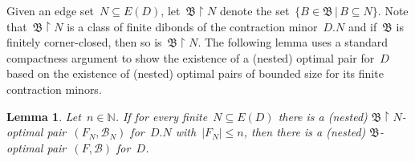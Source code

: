 \documentclass[reqno, 12pt]{amsart}
\numberwithin{equation}{section}
\numberwithin{figure}{section}
\theoremstyle{plain}
\newtheorem{lemma}[thm]{Lemma}
\theoremstyle{definition}
\newcommand{\restricted}{\ensuremath{{\upharpoonright}}}
\newcommand{\abs}[1]{\ensuremath{{\lvert {#1} \rvert}}}
\begin{document}
\vspace{0.2cm}

Given an edge set~${N \subseteq E(D)}$, let~${\mathfrak{B}\restricted{N}}$ denote the set~${\{ B \in \mathfrak{B} \, | \, B \subseteq N \}}$. 
Note that~$\mathfrak{B}\restricted{N}$ is a class of finite dibonds of the contraction minor~${D.N}$ and if~$\mathfrak{B}$ is finitely corner-closed, then so is~$\mathfrak{B}\restricted{N}$. 
The following lemma uses a standard compactness argument to show the existence of a (nested) optimal pair for~$D$ based on the existence of (nested) optimal pairs of bounded size for its finite contraction minors.

\begin{lemma}
    \label{lem:fin-parameter-compactness}
    Let~${n \in \mathbb{N}}$. 
    If for every finite~${N \subseteq E(D)}$ there is a (nested) ${\mathfrak{B}\restricted{N}}$-optimal pair~${(F_N, \mathcal{B}_N)}$ for~${D.N}$ with~${\abs{F_N} \leq n}$, then there is a (nested) $\mathfrak{B}$-optimal pair~${(F, \mathcal{B})}$ for~$D$. 
\end{lemma}
\end{document}
